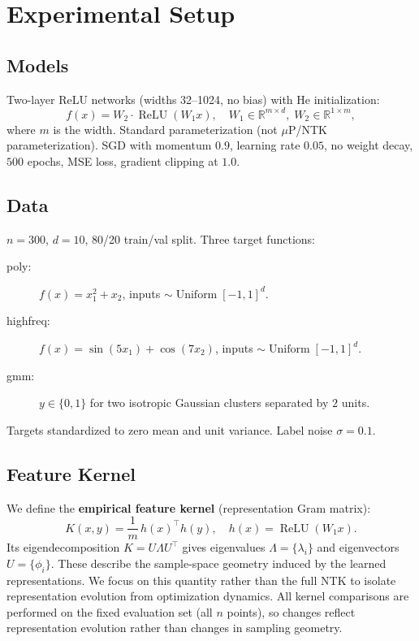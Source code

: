 \documentclass[twoside,11pt]{article}
\begin{document}
\section{Experimental Setup}
\label{sec:setup}

\subsection{Models}
Two-layer ReLU networks (widths 32--1024, no bias) with He initialization:
\[
f(x)=W_{2}\cdot\operatorname{ReLU}(W_{1}x),\quad
W_{1}\in\mathbb{R}^{m\times d},\; W_{2}\in\mathbb{R}^{1\times m},
\]
where $m$ is the width.  Standard parameterization (not $\mu$P/NTK parameterization).  SGD with momentum $0.9$, learning rate $0.05$, no weight decay, $500$ epochs, MSE loss, gradient clipping at $1.0$.

\subsection{Data}
$n=300$, $d=10$, 80/20 train/val split.  Three target functions:
\begin{description}
    \item[poly:] $f(x)=x_{1}^{2}+x_{2}$, inputs $\sim\operatorname{Uniform}[-1,1]^{d}$.
    \item[highfreq:] $f(x)=\sin(5x_{1})+\cos(7x_{2})$, inputs $\sim\operatorname{Uniform}[-1,1]^{d}$.
    \item[gmm:] $y\in\{0,1\}$ for two isotropic Gaussian clusters separated by $2$ units.
\end{description}
Targets standardized to zero mean and unit variance.  Label noise $\sigma=0.1$.

\subsection{Feature Kernel}
We define the \textbf{empirical feature kernel} (representation Gram matrix):
\[
K(x,y)=\frac{1}{m}\,h(x)^{\top}h(y),\quad h(x)=\operatorname{ReLU}(W_{1}x).
\]
Its eigendecomposition $K=U\Lambda U^{\top}$ gives eigenvalues $\Lambda=\{\lambda_{i}\}$ and eigenvectors $U=\{\phi_{i}\}$. These describe the sample-space geometry induced by the learned representations.  We focus on this quantity rather than the full NTK to isolate representation evolution from optimization dynamics.  All kernel comparisons are performed on the fixed evaluation set (all $n$ points), so changes reflect representation evolution rather than changes in sampling geometry.
\end{document}
